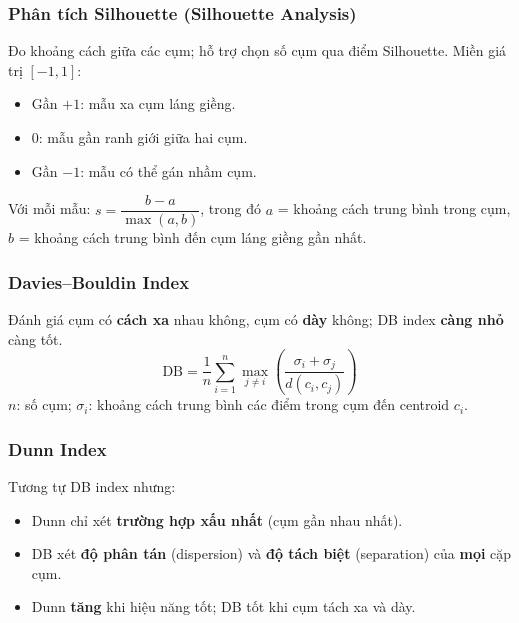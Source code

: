 \subsubsection{Phân tích Silhouette (Silhouette Analysis)}

\begin{tinhchat}[title={Silhouette score}]
Đo khoảng cách giữa các cụm; hỗ trợ chọn số cụm qua điểm Silhouette.
Miền giá trị $[-1, 1]$:
\begin{itemize}
  \item Gần $+1$: mẫu xa cụm láng giềng.
  \item $0$: mẫu gần ranh giới giữa hai cụm.
  \item Gần $-1$: mẫu có thể gán nhầm cụm.
\end{itemize}
\end{tinhchat}

\begin{phuongphap}[title={Công thức}]
Với mỗi mẫu: $s = \dfrac{b - a}{\max(a, b)}$, trong đó $a$ = khoảng cách trung bình trong cụm, $b$ = khoảng cách trung bình đến cụm láng giềng gần nhất.
\end{phuongphap}

\subsubsection{Davies--Bouldin Index}

\begin{tinhchat}[title={DB index}]
Đánh giá cụm có \textbf{cách xa} nhau không, cụm có \textbf{dày} không; DB index \textbf{càng nhỏ} càng tốt.
\[
\mathrm{DB} = \frac{1}{n}\sum_{i=1}^{n} \max_{j \neq i}
\left( \frac{\sigma_i + \sigma_j}{d(c_i, c_j)} \right)
\]
$n$: số cụm; $\sigma_i$: khoảng cách trung bình các điểm trong cụm đến centroid $c_i$.
\end{tinhchat}

\subsubsection{Dunn Index}

\begin{tinhchat}[title={Dunn Index}]
Tương tự DB index nhưng:
\begin{itemize}
  \item Dunn chỉ xét \textbf{trường hợp xấu nhất} (cụm gần nhau nhất).
  \item DB xét \textbf{độ phân tán} (dispersion) và \textbf{độ tách biệt} (separation) của \textbf{mọi} cặp cụm.
  \item Dunn \textbf{tăng} khi hiệu năng tốt; DB tốt khi cụm tách xa và dày.
\end{itemize}
\end{tinhchat}

